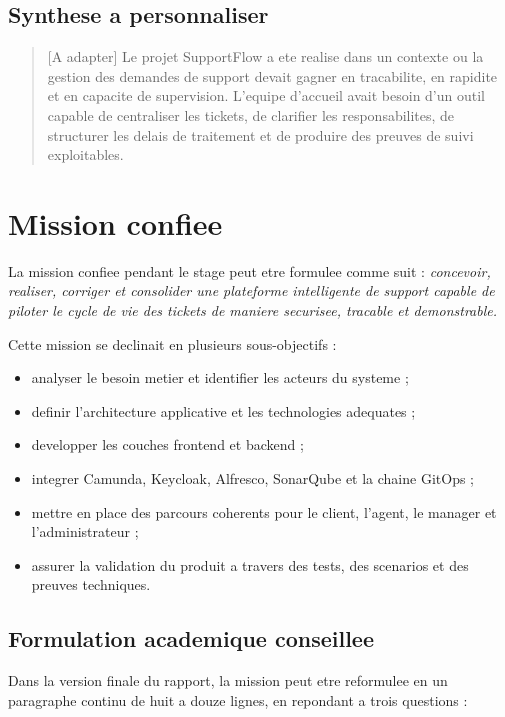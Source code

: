 \subsection{Synthese a personnaliser}

\begin{quote}
[A adapter] Le projet SupportFlow a ete realise dans un contexte ou la gestion des demandes de support devait gagner en tracabilite, en rapidite et en capacite de supervision. L'equipe d'accueil avait besoin d'un outil capable de centraliser les tickets, de clarifier les responsabilites, de structurer les delais de traitement et de produire des preuves de suivi exploitables.
\end{quote}

\section{Mission confiee}

La mission confiee pendant le stage peut etre formulee comme suit : \textit{concevoir, realiser, corriger et consolider une plateforme intelligente de support capable de piloter le cycle de vie des tickets de maniere securisee, tracable et demonstrable.}

Cette mission se declinait en plusieurs sous-objectifs :

\begin{itemize}[leftmargin=1.2cm]
  \item analyser le besoin metier et identifier les acteurs du systeme ;
  \item definir l'architecture applicative et les technologies adequates ;
  \item developper les couches frontend et backend ;
  \item integrer Camunda, Keycloak, Alfresco, SonarQube et la chaine GitOps ;
  \item mettre en place des parcours coherents pour le client, l'agent, le manager et l'administrateur ;
  \item assurer la validation du produit a travers des tests, des scenarios et des preuves techniques.
\end{itemize}

\subsection{Formulation academique conseillee}

Dans la version finale du rapport, la mission peut etre reformulee en un paragraphe continu de huit a douze lignes, en repondant a trois questions :

